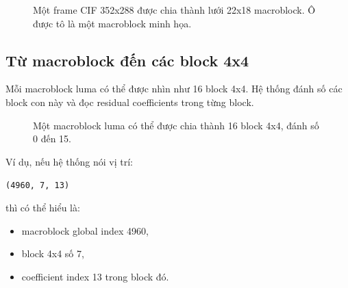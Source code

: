 \documentclass[11pt,a4paper]{article}
\begin{document}
\begin{figure}[H]
\centering
{}
\caption{Một frame CIF 352x288 được chia thành lưới 22x18 macroblock. Ô được tô là một macroblock minh họa.}
\label{fig:macroblock-grid}
\end{figure}

\subsection{Từ macroblock đến các block 4x4}

Mỗi macroblock luma có thể được nhìn như 16 block 4x4. Hệ thống đánh số các
block con này và đọc residual coefficients trong từng block.

\begin{figure}[H]
\centering
{}
\caption{Một macroblock luma có thể được chia thành 16 block 4x4, đánh số 0 đến 15.}
\label{fig:block-index-grid}
\end{figure}

Ví dụ, nếu hệ thống nói vị trí:

\begin{center}
\texttt{(4960, 7, 13)}
\end{center}

thì có thể hiểu là:

\begin{itemize}[leftmargin=*]
  \item macroblock global index 4960,
  \item block 4x4 số 7,
  \item coefficient index 13 trong block đó.
\end{itemize}
\end{document}
